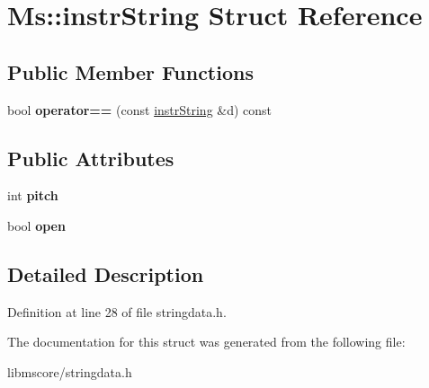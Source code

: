 \hypertarget{struct_ms_1_1instr_string}{}\section{Ms\+:\+:instr\+String Struct Reference}
\label{struct_ms_1_1instr_string}
\subsection*{Public Member Functions}
\begin{DoxyCompactItemize}
\item 
\mbox{\label{struct_ms_1_1instr_string_a007394ac8d19829ae58ac75a69a128af}} 
bool {\bfseries operator==} (const \hyperlink{struct_ms_1_1instr_string}{instr\+String} \&d) const
\end{DoxyCompactItemize}
\subsection*{Public Attributes}
\begin{DoxyCompactItemize}
\item 
\mbox{\label{struct_ms_1_1instr_string_af98a46889954b82d4d5bf4682f2c8d51}} 
int {\bfseries pitch}
\item 
\mbox{\label{struct_ms_1_1instr_string_a0d35f2565ae2b2fbf13ef95a63f7170e}} 
bool {\bfseries open}
\end{DoxyCompactItemize}


\subsection{Detailed Description}


Definition at line 28 of file stringdata.\+h.



The documentation for this struct was generated from the following file\+:\begin{DoxyCompactItemize}
\item 
libmscore/stringdata.\+h\end{DoxyCompactItemize}
